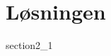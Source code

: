 \documentclass[class=report, crop=false]{standalone}
\begin{document}
    \chapter{Løsningen}
    \label{kapitel2}
    {section2_1}
\end{document}
